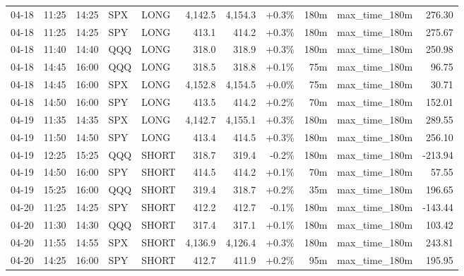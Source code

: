 \documentclass[11pt,a4paper,twoside]{article}
\begin{document}
\begin{center}
\begin{longtable}{>{\color{txtmain}}l l l l l r r r r >{\color{txtmain}}l r}
04-18 & 11:25 & 14:25 & SPX & LONG & 4,142.5 & 4,154.3 & \textcolor{wingreen}{+0.3\%} & 180m & max\_time\_180m & \textcolor{wingreen}{276.30} \\
04-18 & 11:25 & 14:25 & SPY & LONG & 413.1 & 414.2 & \textcolor{wingreen}{+0.3\%} & 180m & max\_time\_180m & \textcolor{wingreen}{275.67} \\
04-18 & 11:40 & 14:40 & QQQ & LONG & 318.0 & 318.9 & \textcolor{wingreen}{+0.3\%} & 180m & max\_time\_180m & \textcolor{wingreen}{250.98} \\
04-18 & 14:45 & 16:00 & QQQ & LONG & 318.5 & 318.8 & \textcolor{wingreen}{+0.1\%} & 75m & max\_time\_180m & \textcolor{wingreen}{96.75} \\
04-18 & 14:45 & 16:00 & SPX & LONG & 4,152.8 & 4,154.5 & \textcolor{wingreen}{+0.0\%} & 75m & max\_time\_180m & \textcolor{wingreen}{30.71} \\
04-18 & 14:50 & 16:00 & SPY & LONG & 413.5 & 414.2 & \textcolor{wingreen}{+0.2\%} & 70m & max\_time\_180m & \textcolor{wingreen}{152.01} \\
04-19 & 11:35 & 14:35 & SPX & LONG & 4,142.7 & 4,155.1 & \textcolor{wingreen}{+0.3\%} & 180m & max\_time\_180m & \textcolor{wingreen}{289.55} \\
04-19 & 11:50 & 14:50 & SPY & LONG & 413.4 & 414.5 & \textcolor{wingreen}{+0.3\%} & 180m & max\_time\_180m & \textcolor{wingreen}{256.10} \\
04-19 & 12:25 & 15:25 & QQQ & SHORT & 318.7 & 319.4 & \textcolor{lossred}{-0.2\%} & 180m & max\_time\_180m & \textcolor{lossred}{-213.94} \\
04-19 & 14:50 & 16:00 & SPY & SHORT & 414.5 & 414.2 & \textcolor{wingreen}{+0.1\%} & 70m & max\_time\_180m & \textcolor{wingreen}{57.55} \\
04-19 & 15:25 & 16:00 & QQQ & SHORT & 319.4 & 318.7 & \textcolor{wingreen}{+0.2\%} & 35m & max\_time\_180m & \textcolor{wingreen}{196.65} \\
04-20 & 11:25 & 14:25 & SPY & SHORT & 412.2 & 412.7 & \textcolor{lossred}{-0.1\%} & 180m & max\_time\_180m & \textcolor{lossred}{-143.44} \\
04-20 & 11:30 & 14:30 & QQQ & SHORT & 317.4 & 317.1 & \textcolor{wingreen}{+0.1\%} & 180m & max\_time\_180m & \textcolor{wingreen}{103.42} \\
04-20 & 11:55 & 14:55 & SPX & SHORT & 4,136.9 & 4,126.4 & \textcolor{wingreen}{+0.3\%} & 180m & max\_time\_180m & \textcolor{wingreen}{243.81} \\
04-20 & 14:25 & 16:00 & SPY & SHORT & 412.7 & 411.9 & \textcolor{wingreen}{+0.2\%} & 95m & max\_time\_180m & \textcolor{wingreen}{195.95} \\

\end{longtable}
\end{center}
\end{document}
